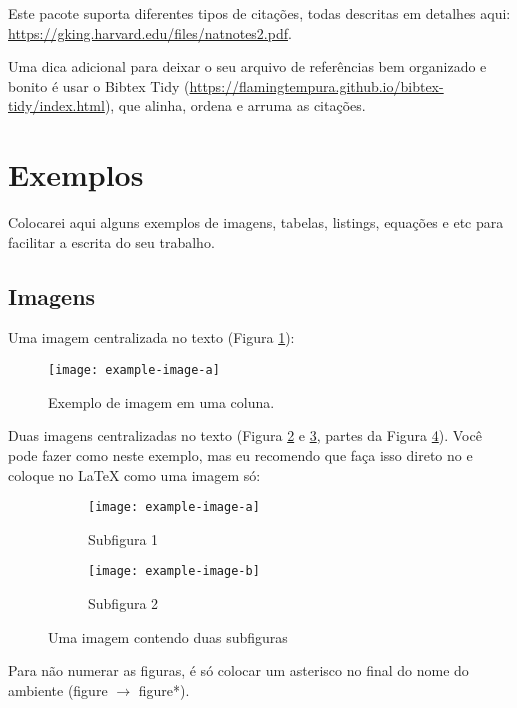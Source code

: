     Este pacote suporta diferentes tipos de citações, todas descritas em detalhes aqui: \url{https://gking.harvard.edu/files/natnotes2.pdf}.

    Uma dica adicional para deixar o seu arquivo de referências bem organizado e bonito é usar o Bibtex Tidy (\url{https://flamingtempura.github.io/bibtex-tidy/index.html}), que alinha, ordena e arruma as citações.

  \section{Exemplos}
    Colocarei aqui alguns exemplos de imagens, tabelas, listings, equações e etc para facilitar a escrita do seu trabalho.

    \subsection{Imagens}
    Uma imagem centralizada no texto (Figura \ref{fig:ex_1col}):
    \begin{figure}[h]
      \centering
      \texttt{[image: example-image-a]}
      \caption{Exemplo de imagem em uma coluna.}
      \label{fig:ex_1col}
    \end{figure}

    Duas imagens centralizadas no texto (Figura \ref{fig:sub_1} e \ref{fig:sub_2}, partes da Figura \ref{fig:ex_2cols}). Você pode fazer como neste exemplo, mas eu recomendo que faça isso direto no  e coloque no \LaTeX{} como uma imagem só:
    \begin{figure}[h]
      \centering
      \begin{subfigure}{.45\textwidth}
        \centering
        \texttt{[image: example-image-a]}
        \caption{Subfigura 1}
        \label{fig:sub_1}
      \end{subfigure}%
      \begin{subfigure}{.45\textwidth}
        \centering
        \texttt{[image: example-image-b]}
        \caption{Subfigura 2}
        \label{fig:sub_2}
      \end{subfigure}
      \caption{Uma imagem contendo duas subfiguras}
      \label{fig:ex_2cols}
    \end{figure}

    Para não numerar as figuras, é só colocar um asterisco no final do nome do ambiente (figure $\rightarrow$ figure*).
    
